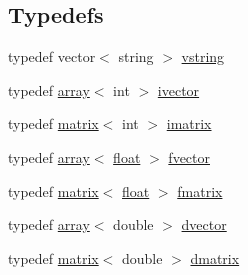 \subsection*{Typedefs}
\begin{DoxyCompactItemize}
\item 
typedef vector$<$ string $>$ \hyperlink{namespaceupc_ab61343ef80507c505066d99a281645ee}{vstring}
\item 
typedef \hyperlink{classupc_1_1array}{array}$<$ int $>$ \hyperlink{namespaceupc_a31ef55c6b4d2d73fd78e70710297c8f4}{ivector}
\item 
typedef \hyperlink{classupc_1_1matrix}{matrix}$<$ int $>$ \hyperlink{namespaceupc_a6bb820f56fc4cc2c976ac0ceeaa8e611}{imatrix}
\item 
typedef \hyperlink{classupc_1_1array}{array}$<$ \hyperlink{FFTReal__readme_8txt_a0ea2fae2a8106200bf378b90eae003cf}{float} $>$ \hyperlink{namespaceupc_a12a5d4885a36892c03181736f8b3089c}{fvector}
\item 
typedef \hyperlink{classupc_1_1matrix}{matrix}$<$ \hyperlink{FFTReal__readme_8txt_a0ea2fae2a8106200bf378b90eae003cf}{float} $>$ \hyperlink{namespaceupc_a9f26dfcf21c4c5cee20f5733be78ba11}{fmatrix}
\item 
typedef \hyperlink{classupc_1_1array}{array}$<$ double $>$ \hyperlink{namespaceupc_a226c72b20137fbf8cc10b0c0ca887b5d}{dvector}
\item 
typedef \hyperlink{classupc_1_1matrix}{matrix}$<$ double $>$ \hyperlink{namespaceupc_a53f2db863d6ef79ba43159171dce9612}{dmatrix}
\end{DoxyCompactItemize}
